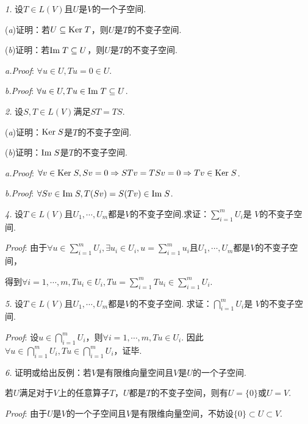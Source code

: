 \textit{1.}
设\(T \in L(V)\)且\(U\)是\(V\)的一个子空间.

(\textit{a})证明：若\(U \subseteq \mathrm{Ker \;} T\)，则\(U\)是\(T\)的不变子空间.

(\textit{b})证明：若\(\mathrm{Im \;} T \subseteq U\)，则\(U\)是\(T\)的不变子空间.

\textit{a.Proof}:
\(\forall u \in U,Tu=0 \in U\).

\textit{b.Proof}:
\(\forall u \in U,Tu \in \mathrm{Im \;} T \subseteq U\).

\hspace*{\fill}

\textit{2.}
设\(S,T \in L(V)\)满足\(ST=TS\).

(\textit{a})证明：\(\mathrm{Ker \;} S\)是\(T\)的不变子空间.

(\textit{b})证明：\(\mathrm{Im \;} S\)是\(T\)的不变子空间.

\textit{a.Proof}:
\(\forall v \in \mathrm{Ker \;} S,Sv=0 \Rightarrow STv=TSv=0 \Rightarrow Tv \in \mathrm{Ker \;} S\).

\textit{b.Proof}:
\(\forall Sv \in \mathrm{Im \;} S,T(Sv)=S(Tv) \in \mathrm{Im \;} S\).

\hspace*{\fill}

\textit{4.}
设\(T \in L(V)\)且\(U_1,\cdots,U_m\)都是\(V\)的不变子空间.求证：\(\sum_{i=1}^m U_i\)是 \(V\)的不变子空间.

\textit{Proof}:
由于\(\forall u \in \sum_{i=1}^m U_i,\exists u_i \in U_i,u=\sum_{i=1}^m u_i\)且\(U_1,\cdots,U_m\)都是\(V\)的不变子空间，

得到\(\forall i=1,\cdots,m,Tu_i \in U_i,Tu=\sum_{i=1}^m Tu_i \in \sum_{i=1}^m U_i\).

\hspace*{\fill}

\textit{5.}
设\(T \in L(V)\)且\(U_1,\cdots,U_m\)都是\(V\)的不变子空间.
求证：\(\bigcap_{i=1}^m U_i\)是 \(V\)的不变子空间.

\textit{Proof}:
设\(u \in \bigcap_{i=1}^m U_i\)，则\(\forall i=1,\cdots,m,Tu \in U_i\).
因此\(\forall u \in \bigcap_{i=1}^m U_i,Tu \in \bigcap_{i=1}^m U_i\)，证毕.

\hspace*{\fill}

\textit{6.}
证明或给出反例：若\(V\)是有限维向量空间且\(V\)是\(U\)的一个子空间.

若\(U\)满足对于\(V\)上的任意算子\(T\)，\(U\)都是\(T\)的不变子空间，则有\(U=\{0\}\)或\(U=V\).

\textit{Proof}:
由于\(U\)是\(V\)的一个子空间且\(V\)是有限维向量空间，不妨设\(\{0\} \subset U \subset V\).

